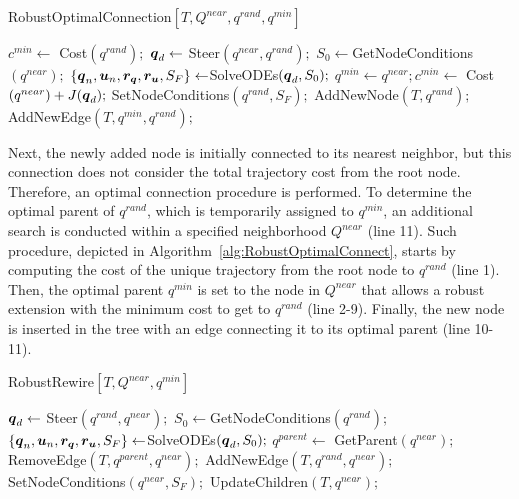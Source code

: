 \begin{algorithm}[h!]
    \caption{RobustOptimalConnection$[T, Q^{near}, q^{rand}, q^{min}]$}\label{alg:RobustOptimalConnect}
    \begin{algorithmic}[1]
        \State $c^{min} \gets$ Cost$(q^{rand});$
            \State $\boldsymbol{q}_d \gets$ Steer$(q^{near},q^{rand});$
            \State $S_0 \gets $GetNodeConditions$({q^{near}});$
            \State $\left \{\boldsymbol{q}_n, \boldsymbol{u}_n, \boldsymbol{r_q}, \boldsymbol{r_u}, S_F \right \}  \gets $SolveODEs$(\boldsymbol{q}_d, S_0);$
                    \State $q^{min} \gets q^{near}; c^{min} \gets$ Cost$(q^{near}) + J(\boldsymbol{q}_d);$
                    \State SetNodeConditions$({q^{rand}}, S_{F});$
                \EndIf
            \EndIf
        \EndFor
        \State AddNewNode$(T, {q^{rand}});$
        \State AddNewEdge$(T, {q^{min}}, {q^{rand}});$
    \end{algorithmic}
\end{algorithm}

Next, the newly added node is initially connected to its nearest neighbor, but this connection does not consider the total trajectory cost from the root node. 
Therefore, an optimal connection procedure is performed. 
To determine the optimal parent of $q^{rand}$, which is temporarily assigned to $q^{min}$, an additional search is conducted within a specified neighborhood $Q^{near}$ (line 11).
Such procedure, depicted in Algorithm~\ref{alg:RobustOptimalConnect}, starts by computing the cost of the unique trajectory from the root node to $q^{rand}$ (line 1).
Then, the optimal parent $q^{min}$ is set to the node in $Q^{near}$ that allows a robust extension with the minimum cost to get to $q^{rand}$ (line 2-9).
Finally, the new node is inserted in the tree with an edge connecting it to its optimal parent (line 10-11).

\begin{algorithm}[h!]
    \caption{RobustRewire$[T, Q^{near}, q^{min}]$}\label{alg:RobustRewire}
    \begin{algorithmic}[1]
            \State $\boldsymbol{q}_d \gets$ Steer$(q^{rand}, q^{near});$
            \State $S_0 \gets $GetNodeConditions$({q^{rand}});$
            \State $\left \{\boldsymbol{q}_n, \boldsymbol{u}_n, \boldsymbol{r_q}, \boldsymbol{r_u}, S_F \right \}  \gets $SolveODEs$(\boldsymbol{q}_d, S_0);$
                    \State $q^{parent} \gets$ GetParent$(q^{near});$
                    \State RemoveEdge$(T, q^{parent}, q^{near});$
                    \State AddNewEdge$(T, q^{rand}, q^{near});$
                    \State SetNodeConditions$(q^{near}, S_{F});$
                    \State UpdateChildren$(T, q^{near});$
                \EndIf
            \EndIf
        \EndFor
    \end{algorithmic}
\end{algorithm}

